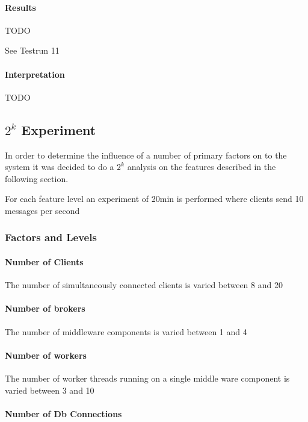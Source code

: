 \documentclass[milestone1.tex]{subfiles}
\begin{document}
\paragraph{Results}

TODO

See Testrun 11


\paragraph{Interpretation}

TODO

\subsection{$2^k$ Experiment}
In order to determine the influence of a number of primary factors on to the system it was decided to do a $2^k$ analysis on the features described in the following section.

For each feature level an experiment of 20min is performed where clients send 10 messages per second

\subsubsection{Factors and Levels}

\paragraph{Number of Clients}
The number of simultaneously connected clients is varied between 8 and 20

\paragraph{Number of brokers}

The number of middleware components is varied between 1 and 4
\paragraph{Number of workers}

The number of worker threads running on a single middle ware component is varied between 3 and 10

\paragraph{Number of Db Connections}
\end{document}
